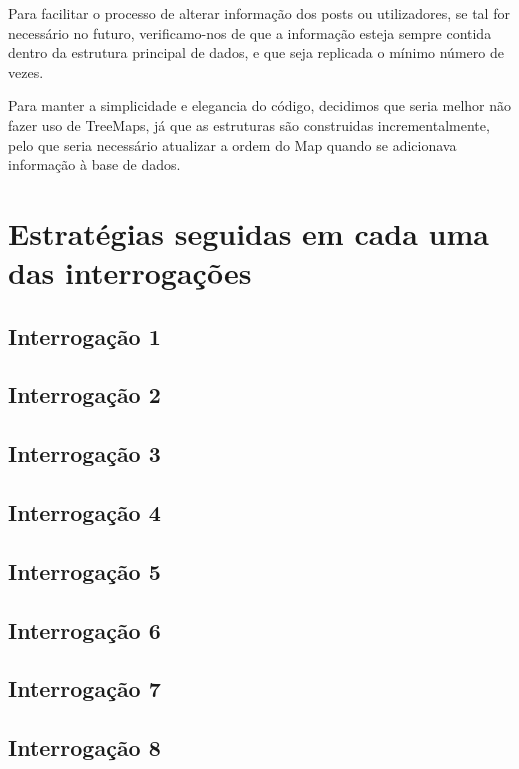\documentclass[10pt]{report}
\newcommand\tab[1][0.5cm]{\hspace*{#1}}
\begin{document}
\tab Para facilitar o processo de alterar informação dos posts ou utilizadores, se tal for necessário no futuro, verificamo-nos de que a informação esteja sempre contida dentro da estrutura principal de dados, e que seja replicada o mínimo número de vezes.

Para manter a simplicidade e elegancia do código, decidimos que seria melhor não fazer uso de TreeMaps, já que as estruturas são construidas incrementalmente, pelo que seria necessário atualizar a ordem do Map quando se adicionava informação à base de dados.

\section{Estratégias seguidas em cada uma das interrogações}

\subsection{Interrogação 1}

\subsection{Interrogação 2}

\subsection{Interrogação 3}

\subsection{Interrogação 4}

\subsection{Interrogação 5}

\subsection{Interrogação 6}

\subsection{Interrogação 7}

\subsection{Interrogação 8}
\end{document}
